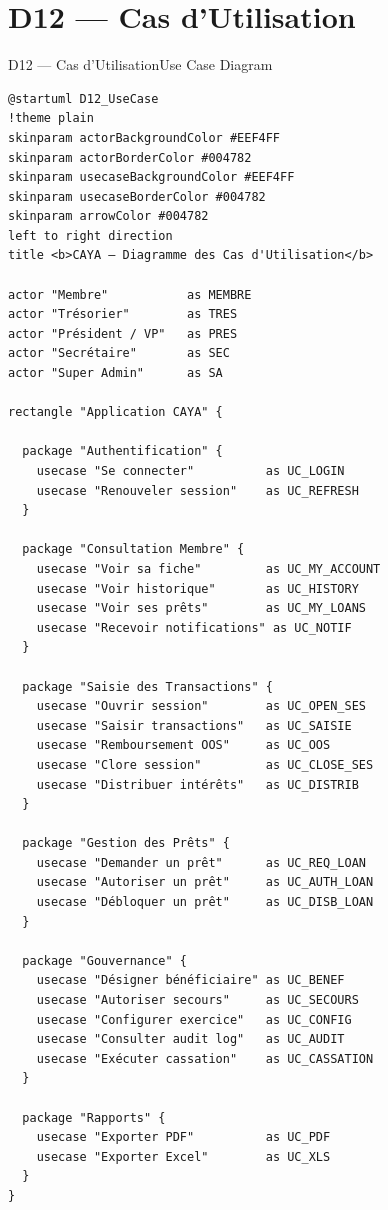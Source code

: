\documentclass[12pt, a4paper]{report}
\begin{document}
\section{D12 — Cas d'Utilisation}

\begin{diagramBox}{D12 — Cas d'Utilisation}{Use Case Diagram}
\begin{lstlisting}
@startuml D12_UseCase
!theme plain
skinparam actorBackgroundColor #EEF4FF
skinparam actorBorderColor #004782
skinparam usecaseBackgroundColor #EEF4FF
skinparam usecaseBorderColor #004782
skinparam arrowColor #004782
left to right direction
title <b>CAYA — Diagramme des Cas d'Utilisation</b>

actor "Membre"           as MEMBRE
actor "Trésorier"        as TRES
actor "Président / VP"   as PRES
actor "Secrétaire"       as SEC
actor "Super Admin"      as SA

rectangle "Application CAYA" {

  package "Authentification" {
    usecase "Se connecter"          as UC_LOGIN
    usecase "Renouveler session"    as UC_REFRESH
  }

  package "Consultation Membre" {
    usecase "Voir sa fiche"         as UC_MY_ACCOUNT
    usecase "Voir historique"       as UC_HISTORY
    usecase "Voir ses prêts"        as UC_MY_LOANS
    usecase "Recevoir notifications" as UC_NOTIF
  }

  package "Saisie des Transactions" {
    usecase "Ouvrir session"        as UC_OPEN_SES
    usecase "Saisir transactions"   as UC_SAISIE
    usecase "Remboursement OOS"     as UC_OOS
    usecase "Clore session"         as UC_CLOSE_SES
    usecase "Distribuer intérêts"   as UC_DISTRIB
  }

  package "Gestion des Prêts" {
    usecase "Demander un prêt"      as UC_REQ_LOAN
    usecase "Autoriser un prêt"     as UC_AUTH_LOAN
    usecase "Débloquer un prêt"     as UC_DISB_LOAN
  }

  package "Gouvernance" {
    usecase "Désigner bénéficiaire" as UC_BENEF
    usecase "Autoriser secours"     as UC_SECOURS
    usecase "Configurer exercice"   as UC_CONFIG
    usecase "Consulter audit log"   as UC_AUDIT
    usecase "Exécuter cassation"    as UC_CASSATION
  }

  package "Rapports" {
    usecase "Exporter PDF"          as UC_PDF
    usecase "Exporter Excel"        as UC_XLS
  }
}


\end{lstlisting}
\end{diagramBox}
\end{document}
